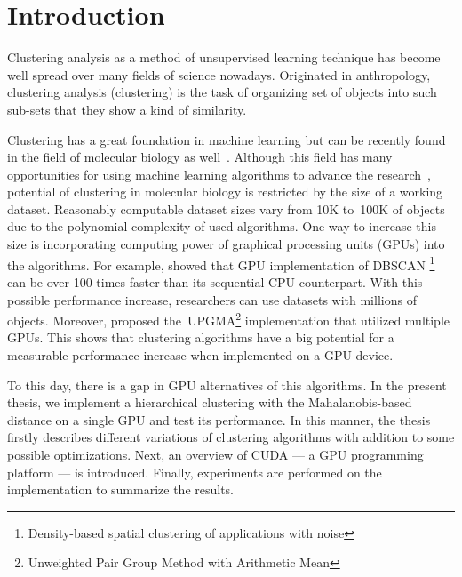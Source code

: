 \chapter*{Introduction}


Clustering analysis as a method of unsupervised learning technique has become well spread over many fields of science nowadays. Originated in anthropology, clustering analysis (clustering) is the task of organizing set of objects into such sub-sets that they show a kind of similarity. 

Clustering has a great foundation in machine learning but can be recently found in the field of molecular biology as well~\cite{Nugent2010}. Although this field has many opportunities for using machine learning algorithms to advance the research~\cite{btaa091}, potential of clustering in molecular biology is restricted by the size of a working dataset. Reasonably computable dataset sizes vary from 10K to~100K of objects due to the polynomial complexity of used algorithms. One way to increase this size is incorporating computing power of graphical processing units (GPUs) into the algorithms. For example, \citet{andrade2013g} showed that GPU implementation of DBSCAN \footnote{Density-based spatial clustering of applications with noise} can be over 100-times faster than its sequential CPU counterpart. With this possible performance increase, researchers can use datasets with millions of objects. Moreover, \citet{hua2017mgupgma} proposed the~UPGMA\footnote{Unweighted Pair Group Method with Arithmetic Mean} implementation that utilized multiple GPUs. This shows that clustering algorithms have a big potential for a measurable performance increase when implemented on a GPU device.

To this day, there is a gap in GPU alternatives of this algorithms. In the present thesis, we implement a hierarchical clustering with the Ma\-ha\-la\-no\-bis-based distance on a single GPU and test its performance. In this manner, the thesis firstly describes different variations of clustering algorithms with addition to some possible optimizations. Next, an overview of CUDA --- a GPU programming platform --- is introduced. Finally, experiments are performed on the implementation to summarize the results.
